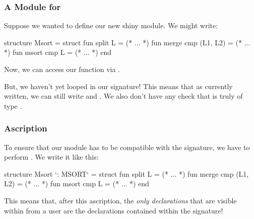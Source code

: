 \documentclass[aspectratio=169, handout]{beamer}
\begin{document}
\begin{frame}[fragile]
  \frametitle{A Module for }

  Suppose we wanted to define our new shiny  module. We might write:

  \pause
  \begin{codeblock}
    structure Msort =
      struct
        fun split L = (* ... *)
        fun merge cmp (L1, L2) = (* ... *)
        fun msort cmp L = (* ... *)
      end
  \end{codeblock}

  \pause
  \vspace{\fill}

  Now, we can access our  function via .

  \pause
  \vspace{\fill}

  But, we haven't yet looped in our  signature! This means that
  as currently written, we can still write  and .
  We also don't have any check that  is truly of type
  .
\end{frame}

\begin{frame}[fragile]
  \frametitle{Ascription}


  \pause
  \vspace{\fill}

  To ensure that our  module has to be compatible with the
   signature, we have to perform . We write it
  like this:

  \begin{codeblock}
    structure Msort `: MSORT` =
      struct
        fun split L = (* ... *)
        fun merge cmp (L1, L2) = (* ... *)
        fun msort cmp L = (* ... *)
      end
  \end{codeblock}

  \pause
  \vspace{\fill}

  This means that, after this ascription, the \textit{only declarations} that
  are visible within  from a user are the declarations contained
  within the  signature!
\end{frame}
\end{document}
